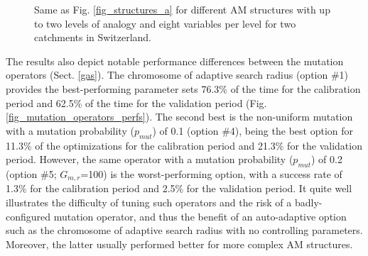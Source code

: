 \documentclass[draft]{agujournal2019}
\begin{document}
\begin{figure}[hbt]
	\noindent{}
	\caption{Same as Fig. \ref{fig_structures_a} for different AM structures with up to two levels of analogy and eight variables per level for two catchments in Switzerland.}
	\label{fig_structures_b}
\end{figure}

The results also depict notable performance differences between the mutation operators (Sect. \ref{gas}). The chromosome of adaptive search radius (option \#1) provides the best-performing parameter sets 76.3\% of the time for the calibration period and 62.5\% of the time for the validation period (Fig. \ref{fig_mutation_operators_perfs}). The second best is the non-uniform mutation with a mutation probability ($p_{mut}$) of 0.1 (option \#4), being the best option for 11.3\% of the optimizations for the calibration period and 21.3\% for the validation period. However, the same operator with a  mutation probability ($p_{mut}$) of 0.2 (option \#5; $G_{m,r}$=100) is the worst-performing option, with a success rate of 1.3\% for the calibration period and 2.5\% for the validation period. It quite well illustrates the difficulty of tuning such operators and the risk of a badly-configured mutation operator, and thus the benefit of an auto-adaptive option such as the chromosome of adaptive search radius with no controlling parameters. Moreover, the latter usually performed better for more complex AM structures.
\end{document}
